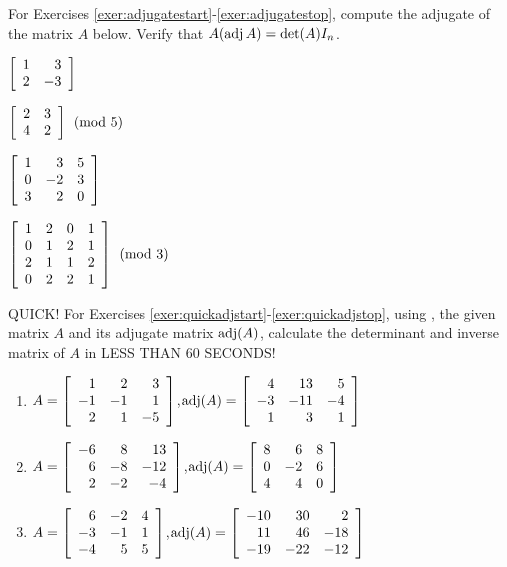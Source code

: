 \noindent For Exercises \ref{exer:adjugatestart}-\ref{exer:adjugatestop}, compute the adjugate of the matrix $A$ below. Verify that $A(\adj A) = \det(A)I_n$.
\begin{enumerate}[!HW!, label=$\spadesuit$ \arabic*., ref=\arabic*]
\begin{multicols}{2}
\item\label{exer:adjugatestart} $\mtx{rr}{1&3\\2&-3}$
\item $\mtx{rr}{2&3\\4&2} \pmod 5$ 
\end{multicols}
\begin{multicols}{2}
\item $\mtx{rrr}{1&3&5\\0&-2&3\\3&2&0}$
\item\label{exer:adjugatestop} $\mtx{rrrr}{1&2&0&1\\0&1&2&1\\2&1&1&2\\0&2&2&1} \pmod 3$
\end{multicols}
\end{enumerate}

\noindent QUICK! For Exercises \ref{exer:quickadjstart}-\ref{exer:quickadjstop}, using , the given matrix $A$ and its adjugate matrix $\adj(A)$, calculate the determinant and inverse matrix of $A$ in LESS THAN 60 SECONDS!
\begin{enumerate}[!HW!]
\item\label{exer:quickadjstart} $A=\mtx{rrr}{1&2&3\\-1&-1&1\\2&1&-5}$,\quad $\adj(A) = \mtx{rrr}{4&13&5\\-3&-11&-4\\1&3&1}$ %
\item $A=\mtx{rrr}{-6&8&13\\6&-8&-12\\2&-2&-4}$,\quad $\adj(A) = \mtx{rrr}{8&6&8\\0&-2&6\\4&4&0}$ %
\item\label{exer:quickadjstop} $A=\mtx{rrr}{6&-2&4\\-3&-1&1\\-4&5&5}$,\quad $\adj(A) = \mtx{rrr}{-10&30&2\\11&46&-18\\-19&-22&-12}$ %
\end{enumerate}

 \mbox{}\vfill
 
\pagebreak